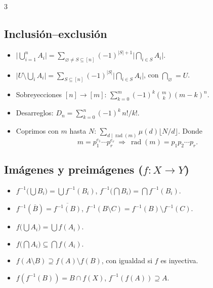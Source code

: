 \documentclass[8pt, spanish, mexico, letterpaper]{extarticle}
\newcommand{\<}{<}
\newcommand{\ov}[1]{\overline{#1}}
\DeclareMathOperator{\rad}{rad}
\begin{document}
\begin{multicols*}{3}
\subsection{Inclusi\'on--exclusi\'on}
\begin{itemize}
  \item $\Big|\bigcup_{i=1}^nA_i\Big|=\sum_{\varnothing\ne S\subseteq[n]}(-1)^{|S|+1}\Big|\bigcap_{i\in S}A_i\Big|$.
  \item $\Big|U\setminus\bigcup_iA_i\Big|=\sum_{S\subseteq[n]}(-1)^{|S|}\Big|\bigcap_{i\in S}A_i\Big|$, con $\bigcap_\varnothing=U$.
  \item Sobreyecciones $[n]\to[m]$: $\sum_{k=0}^m(-1)^k\binom mk(m-k)^n$.
  \item Desarreglos: $D_n=\sum_{k=0}^n(-1)^k\,n!/k!$.
  \item Coprimos con $m$ hasta $N$: $\sum_{d\mid\rad(m)}\mu(d)\lfloor N/d\rfloor$. Donde $$m=p_1^{e_1}\cdots p_r^{e_r}\ \Longrightarrow\ \operatorname{rad}(m)=p_1p_2\cdots p_r.$$
\end{itemize}


\subsection{Im\'agenes y preim\'agenes ($f:X\to Y$)}
\begin{itemize}
  \item $f^{-1}\big(\bigcup B_i\big)=\bigcup f^{-1}(B_i)$, \; $f^{-1}\big(\bigcap B_i\big)=\bigcap f^{-1}(B_i)$.
  \item $f^{-1}(\ov B)=\ov{f^{-1}(B)}$, \quad $f^{-1}(B\setminus C)=f^{-1}(B)\setminus f^{-1}(C)$.
  \item $f\big(\bigcup A_i\big)=\bigcup f(A_i)$.
  \item $f\big(\bigcap A_i\big)\subseteq\bigcap f(A_i)$.
  \item $f(A\setminus B)\supseteq f(A)\setminus f(B)$, con igualdad si $f$ es inyectiva.
  \item $f(f^{-1}(B))=B\cap f(X)$, \quad $f^{-1}(f(A))\supseteq A$.
\end{itemize}
 



\end{multicols*}
\end{document}
